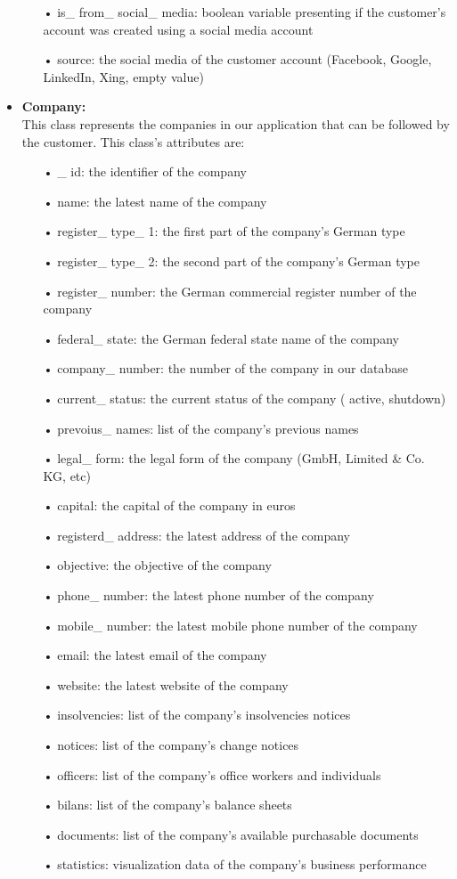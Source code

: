 \begin{itemize}
\begin{itemize}
\item[•] is\_ from\_ social\_ media: boolean variable presenting if the customer's account was created using a social media account
\item[•] source: the social media of the customer account (Facebook, Google, LinkedIn, Xing, empty value)
\end{itemize}
\item \textbf{Company:}\\
This class represents the companies in our application that can be followed by the customer. This class's attributes are:
\begin{itemize}
\item[•] \_ id: the identifier of the company
\item[•] name: the latest name of the company
\item[•] register\_ type\_ 1: the first part of the company's German type
\item[•] register\_ type\_ 2: the second part of the company's German type
\item[•] register\_ number: the German commercial register number of the company
\item[•] federal\_ state: the German federal state name of the company
\item[•] company\_ number: the number of the company in our database
\item[•] current\_ status: the current status of the company ( active, shutdown)
\item[•] prevoius\_ names: list of the company's previous names
\item[•] legal\_ form: the legal form of the company (GmbH, Limited \& Co. KG, etc)
\item[•] capital: the capital of the company in euros
\item[•] registerd\_ address: the latest address of the company
\item[•] objective: the objective of the company
\item[•] phone\_ number: the latest phone number of the company
\item[•] mobile\_ number: the latest mobile phone number of the company
\item[•] email: the latest email of the company
\item[•] website: the latest website of the company
\item[•] insolvencies: list of the company's insolvencies notices
\item[•] notices: list of the company's change notices
\item[•] officers: list of the company's office workers and individuals
\item[•] bilans: list of the company's balance sheets
\item[•] documents: list of the company's available purchasable documents
\item[•] statistics: visualization data of the company's business performance 



\end{itemize}
\end{itemize}
